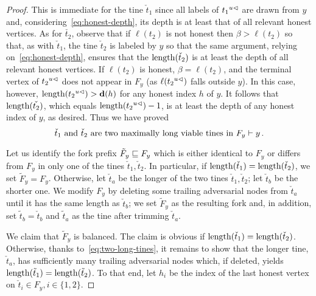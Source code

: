 \begin{proof}
    This is immediate for the tine
    $\check{t}_1$ since all labels of $\cut{u}{t_1}$ are drawn from
    $y$ and, considering~\eqref{eq:honest-depth}, its depth is
    at least that of all relevant honest vertices. 
    As for $\check{t_2}$,
    observe that if $\ell(t_2)$ is not honest then $\beta > \ell(t_2)$
    so that, as with $\check{t}_1$, the tine $\check{t}_2$ is labeled by
    $y$ so that the same argument, relying
    on~\eqref{eq:honest-depth}, ensures that the $\length(\check{t}_2)$ 
    is at least 
    the depth of all relevant honest vertices. 
    If $\ell(t_2)$ is
    honest, $\beta = \ell(t_2)$, and the terminal vertex of
    $\cut{u}{t_2}$ does not appear in $F_y$ (as $\ell(\cut{u}{t_2})$ falls outside 
    $y$). In this case, however,
    $\length(\cut{u}{t_2}) > \hdepth(h)$ for any honest index $h$ of
    $y$. 
    It follows that
    $\length(\check{t_2})$, which equals $\length(\cut{u}{t_2}) - 1$, 
    is at least the
    depth of any honest index of $y$, as desired. 
    Thus we have proved
    \begin{equation}\label{eq:two-long-tines}
        \text{$\check{t}_1$ and $\check{t}_2$ are 
        two maximally long viable tines in $F_y \Fork y$}
        \,.
    \end{equation}

    Let us identify the fork prefix $\tilde{F}_y \ForkPrefix F_y$ which 
    is either identical to $F_y$ or differs from $F_y$ 
    in only one of the tines $\check{t}_1, \check{t}_2$. 
    In particular, if $\length(\check{t}_1) = \length(\check{t}_2)$, we set $\tilde{F}_y = F_y$. 
    Otherwise, let $\check{t}_a$ be the longer of the two tines $\check{t}_1, \check{t}_2$; 
    let $\check{t}_b$ be the shorter one. 
    We modify $F_y$ by deleting some trailing adversarial nodes from $\check{t}_a$ 
    until it has the same length as $\check{t}_b$; 
    we set $\tilde{F}_y$ as the resulting fork 
    and, in addition, 
    set $\tilde{t}_b = \check{t}_b$ and 
    $\tilde{t}_a$ as the tine after trimming $\check{t}_a$. 
    
    We claim that $\tilde{F}_y$ is balanced. 
    The claim is obvious if $\length(\check{t}_1) = \length(\check{t}_2)$.
    Otherwise, thanks to~\eqref{eq:two-long-tines}, 
    it remains to show that the longer tine, $\check{t}_a$, 
    has sufficiently many trailing adversarial nodes which, 
    if deleted, yields $\length(\Final{t}_1) = \length(\Final{t}_2)$. 
    To that end, let $h_i$ be the index of the last honest vertex 
    on $\check{t}_i \in F_y, i \in \{1,2\}$. 
    

\end{proof}
